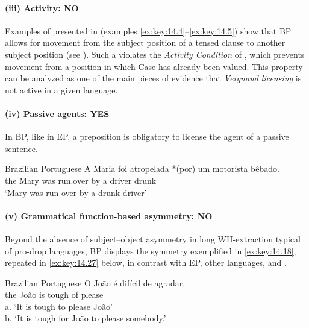 \documentclass[output=paper]{langsci/langscibook}
\begin{document}
\paragraph*{(iii) Activity: NO}

Examples of  presented in  (examples
\eqref{ex:key:14.4}--\eqref{ex:key:14.5}) show that \gls{BP} allows for
movement from the subject position of a tensed clause to another subject
position (see \citealt{NunesMartins2010}). Such a  violates the
\emph{Activity Condition} of \textcite{Chomsky2000,Chomsky2001}, which prevents
movement from a position in which Case has already been valued. This property
can be analyzed as one of the main pieces of evidence that \emph{Vergnaud
licensing} is not active in a given language.

\paragraph*{(iv) Passive agents: YES}

In \gls{BP}, like in \gls{EP}, a preposition is obligatory to license the
agent of a passive sentence.

\ea\label{ex:key:14.26}Brazilian Portuguese
    \sn
    \gll    A Maria foi atropelada *(por) um motorista bêbado.\\
            the Mary was run.over \hphantom{*(}by a driver drunk\\
    \glt    ‘Mary was run over by a drunk driver’\\
\z

\paragraph*{(v) Grammatical function-based asymmetry: NO}

Beyond the absence of subject--object asymmetry in long
WH-extraction typical
of pro-drop languages, \gls{BP} displays the symmetry exemplified in
\eqref{ex:key:14.18}, repeated in \eqref{ex:key:14.27} below, in contrast with \gls{EP},
other  languages, and .\newpage

\ea%
    \label{ex:key:14.27}Brazilian Portuguese
    \sn
    \gll    O João é difícil de agradar.\\
            the João is tough of please\\
	\glt    a. ‘It is tough to please João’\\
            b. ‘It is tough for João to please somebody.’
\z
\end{document}
